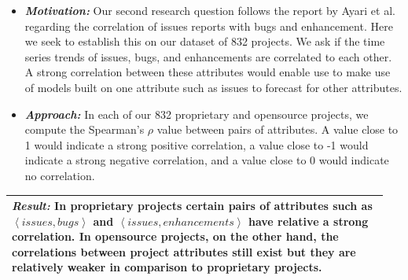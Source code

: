 \documentclass[sigconf, preprint]{acmart}
\begin{document}
\begin{itemize}[leftmargin=-1pt]

\item[] \textit{\textbf{Motivation:}} Our second research question follows the 
report 
by Ayari et al.~\cite{ayari2007threats} regarding the correlation of issues 
reports with bugs and enhancement. Here we seek to establish this 
on our dataset of 832 projects. We ask if the time series trends of 
issues, bugs, and enhancements are correlated to each other. A strong 
correlation between these attributes would enable use to make use of models 
built on one attribute such as issues to forecast for other attributes.

\item[] \textit{\textbf{Approach:}} In each of our 832 proprietary and 
opensource 
projects, we compute the Spearman's $\rho$ value between pairs of 
attributes. 
A value close to 1 would indicate a strong positive correlation, a value 
close to -1 would indicate a strong negative correlation, and a value close 
to 0 would indicate no correlation.\\[-.3cm]
\end{itemize}

\vspace{0.1cm}
\noindent\begin{minipage}{\linewidth}
	\begin{center}
		\begin{tabular}{p{0.95\linewidth}}
			\arrayrulecolor{Gray}
			\hline
			 
			\rowcolor{Gray}  \textit{\textbf{Result:}} In proprietary projects certain 
pairs 
of attributes such as $\left< issues, bugs\right>$ and $\left< 
issues, 
enhancements\right>$ have relative a strong correlation. In opensource 
projects, on the other hand, the correlations between project attributes 
still exist but they are relatively weaker in comparison to proprietary 
projects.\\\hline
		\end{tabular}
	\end{center}
\end{minipage}\bigstrut[t]\\[-0.35cm]
\end{document}
